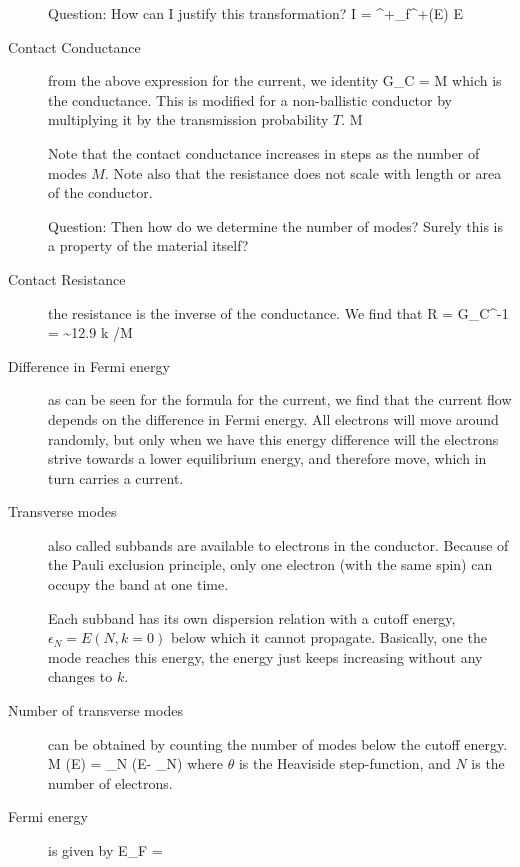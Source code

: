 \begin{description}
Question: How can I justify this transformation? 
\beq
I =  \int^{+\infty}_\epsilon f^+(E) \intd E
\eeq


\item[Contact Conductance] from the above expression for the current, we identity
\beq
 G_C =  M
\eeq
which is the conductance. This is modified for a non-ballistic conductor by multiplying it by the transmission probability $T$. M

Note that the contact conductance increases in steps as the number of modes $M$. Note also that the resistance does not scale with length or area of the conductor. 

Question: Then how do we determine the number of modes? Surely this is a property of the material itself? 


\item[Contact Resistance] the resistance is the inverse of the conductance. We find that
\beq
R = G_C^{-1} =  \sim 12.9 k \Omega /M
\eeq

\item[Difference in Fermi energy] as can be seen for the formula for the current, we find that the current flow depends on the difference in Fermi energy. All electrons will move around randomly, but only when we have this energy difference will the electrons strive towards a lower equilibrium energy, and therefore move, which in turn carries a current. 

\item[Transverse modes] also called subbands are available to electrons in the conductor. Because of the Pauli exclusion principle, only one electron (with the same spin) can occupy the band at one time. 

Each subband has its own dispersion relation with a cutoff energy, $\epsilon_N = E(N, k=0)$ below which it cannot propagate. Basically, one the mode reaches this energy, the energy just keeps increasing without any changes to $k$. 

\item[Number of transverse modes] can be obtained by counting the number of modes below the cutoff energy. 
\beq
M (E) = \sum_N \theta(E- \epsilon_N)
\eeq
where $\theta$ is the Heaviside step-function, and $N$ is the number of electrons. 

\item[Fermi energy] is given by
\beq
E_F = 
\eeq

\end{description}


